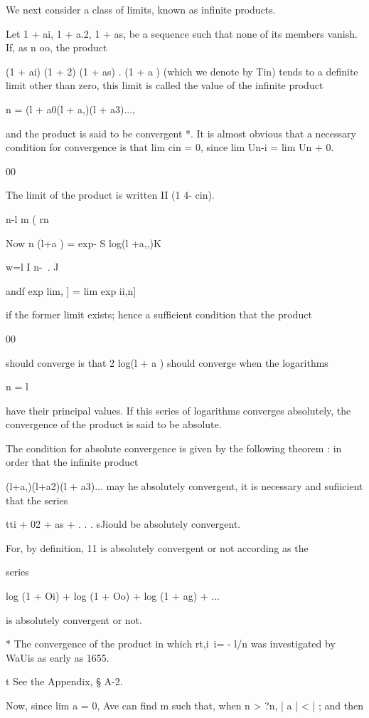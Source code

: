 We next consider a class of limits, known as infinite products.

Let 1 + ai, 1 + a.2, 1 + as,    be a sequence such that none of its
members vanish. If, as n oo, the product

(1 + ai) (1 + 2) (1 + as)   . (1 + a ) (which we denote by Tin)
tends to a definite limit other than zero, this limit is called the
value of the infinite product

n = (l + a0(l + a,)(l + a3)...,

and the product is said to be convergent *. It is almost obvious that
a necessary condition for convergence is that lim cin = 0, since lim
Un-i = lim Un + 0.

00

The limit of the product is written II (1 4- cin).

n-l m ( rn \

Now n (l+a ) = exp- S log(l +a,,)K

w=l I n-\ . J

andf exp lim, ] = lim exp ii,n]

if the former limit exists; hence a sufficient condition that the
product

00

should converge is that 2 log(l + a ) should converge when the
logarithms

n = l

have their principal values. If this series of logarithms converges
absolutely, the convergence of the product is said to be absolute.

The condition for absolute convergence is given by the following
theorem : in order that the infinite product

(l+a,)(l+a2)(l + a3)... may he absolutely convergent, it is necessary
and sufiicient that the series

tti + 02 + as + . . . sJiould be absolutely convergent.

For, by definition, 11 is absolutely convergent or not according as
the

series

log (1 + Oi) + log (1 + Oo) + log (1 + ag) + ...

is absolutely convergent or not.

* The convergence of the product in which rt,i\ i= - l/n was
investigated by WaUis as early as 1655.

t See the Appendix, § A-2.

%
%

Now, since lim a = 0, Ave can find m such that, when n > ?n, | a | < |
; and then

